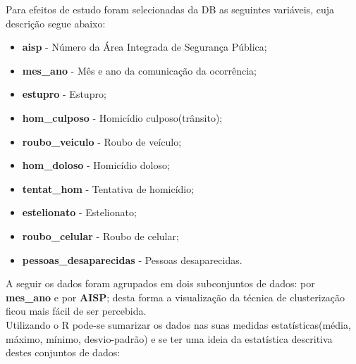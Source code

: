 \documentclass[a4paper, 12pt]{article}
\begin{document}
\begin{multicols}{2}
		  Para efeitos de estudo foram selecionadas da DB as seguintes variáveis, cuja descrição segue abaixo:
		 	\begin{itemize}
		 		\item \textbf{aisp} - Número da Área Integrada de Segurança Pública;
		 		\item \textbf{mes\_ano} - Mês e ano da comunicação da ocorrência;
		 		\item \textbf{estupro} - Estupro;
		 		\item \textbf{hom\_culposo} - Homicídio culposo(trânsito);
		 		\item \textbf{roubo\_veiculo} - Roubo de veículo;
		 		\item \textbf{hom\_doloso} - Homicídio doloso;
		 		\item \textbf{tentat\_hom} - Tentativa de homicídio;
		 		\item \textbf{estelionato} - Estelionato;
		 		\item \textbf{roubo\_celular} - Roubo de celular;
		 		\item \textbf{pessoas\_desaparecidas} - Pessoas desaparecidas.
		 	\end{itemize}
	 	A seguir os dados foram agrupados em dois subconjuntos de dados:  por \textbf{mes\_ano} e por \textbf{AISP};  desta forma a visualização da técnica de clusterização ficou mais fácil de ser percebida. \\
		
		Utilizando o R pode-se sumarizar os dados nas suas medidas estatísticas(média, máximo, mínimo, desvio-padrão) e se ter uma ideia da estatística descritiva destes conjuntos de dados:
	\end{multicols}
\end{document}
